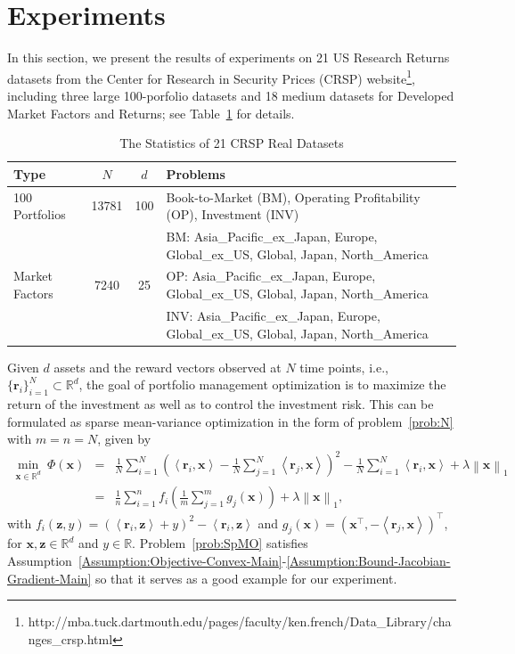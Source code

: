 \documentclass[11pt]{article}
\newcommand{\sr}{\mathbf r}
\newcommand{\x}{\mathbf x}
\newcommand{\z}{\mathbf z}
\newcommand{\br}{\mathbb{R}}
\begin{document}
\section{Experiments} \label{sec:experiment}
In this section, we present the results of experiments on 21 US Research Returns datasets from the Center for Research in Security Prices (CRSP) website\footnote{http://mba.tuck.dartmouth.edu/pages/faculty/ken.french/Data\_Library/changes\_crsp.html}, including three large 100-porfolio datasets and 18 medium datasets for Developed Market Factors and Returns; see Table~\ref{tab:statistics} for details.
\begin{table}[!h]\footnotesize
\vspace{-.5em}\caption{The Statistics of 21 CRSP Real Datasets}\label{tab:statistics}
\begin{tabular}{|l|c|c|l|} \hline
Type & $N$ & $d$ & Problems \\ \hline
100 Portfolios & 13781 & 100 & Book-to-Market (BM), Operating Profitability (OP), Investment (INV) \\ \hline
\multirow{3}{*}{Market Factors} & \multirow{3}{*}{7240} & \multirow{3}{*}{25} & BM: Asia{\_}Pacific{\_}ex{\_}Japan, Europe, Global{\_}ex{\_}US, Global, Japan, North{\_}America \\
& & & OP: Asia{\_}Pacific{\_}ex{\_}Japan, Europe, Global{\_}ex{\_}US, Global, Japan, North{\_}America \\
& & & INV: Asia{\_}Pacific{\_}ex{\_}Japan, Europe, Global{\_}ex{\_}US, Global, Japan, North{\_}America \\ \hline
\end{tabular}\vspace{-1em}
\end{table}

Given $d$ assets and the reward vectors observed at $N$ time points, i.e., $\{\sr_i\}_{i=1}^N \subset \br^d$, the goal of portfolio management optimization is to maximize the return of the investment as well as to control the investment risk. This can be formulated as sparse mean-variance optimization \cite{Ravikumar-2009-Sparse} in the form of problem~\eqref{prob:N} with $m=n=N$, given by
\begin{eqnarray}\label{prob:SpMO}
\min_{\x\in\br^{d}} \  \Phi(\x) & = & \frac{1}{N}\sum_{i=1}^N \left(\left\langle \sr_i, \x\right\rangle - \frac{1}{N}\sum_{j=1}^N \left\langle \sr_j, \x\right\rangle \right)^2 -\frac{1}{N}\sum_{i=1}^N \left\langle \sr_i, \x\right\rangle + \lambda\left\|\x\right\|_1 \\
& = & \frac{1}{n}\sum_{i=1}^n f_i\left(\frac{1}{m}\sum_{j=1}^m g_j(\x)\right) + \lambda\left\|\x\right\|_1, \nonumber
\end{eqnarray}
with $f_i(\z, y) = \left(\left\langle \sr_i, \z\right\rangle + y\right)^2 - \left\langle \sr_i, \z\right\rangle$ and $g_j(\x) = \left(\x^\top, -\left\langle \sr_j, \x\right\rangle\right)^\top$, for $\x,\z\in\br^d$ and $y\in\br$. Problem~\eqref{prob:SpMO} satisfies Assumption~\ref{Assumption:Objective-Convex-Main}-\ref{Assumption:Bound-Jacobian-Gradient-Main} so that it serves as a good example for our experiment.  
\end{document}

